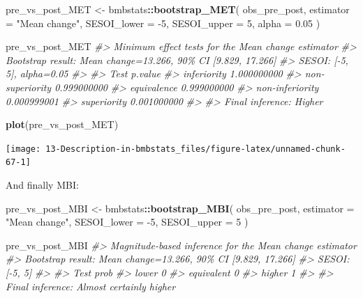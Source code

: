 \documentclass[
]{book}
\newenvironment{Shaded}{\begin{snugshade}}{\end{snugshade}}
\newcommand{\CommentTok}[1]{\textcolor[rgb]{0.56,0.35,0.01}{\textit{#1}}}
\newcommand{\DataTypeTok}[1]{\textcolor[rgb]{0.13,0.29,0.53}{#1}}
\newcommand{\DecValTok}[1]{\textcolor[rgb]{0.00,0.00,0.81}{#1}}
\newcommand{\FloatTok}[1]{\textcolor[rgb]{0.00,0.00,0.81}{#1}}
\newcommand{\KeywordTok}[1]{\textcolor[rgb]{0.13,0.29,0.53}{\textbf{#1}}}
\newcommand{\NormalTok}[1]{#1}
\newcommand{\OperatorTok}[1]{\textcolor[rgb]{0.81,0.36,0.00}{\textbf{#1}}}
\newcommand{\StringTok}[1]{\textcolor[rgb]{0.31,0.60,0.02}{#1}}
\begin{document}
\begin{Shaded}
\begin{Highlighting}[]
\NormalTok{pre\_vs\_post\_MET <{-}}\StringTok{ }\NormalTok{bmbstats}\OperatorTok{::}\KeywordTok{bootstrap\_MET}\NormalTok{(}
\NormalTok{  obs\_pre\_post,}
  \DataTypeTok{estimator =} \StringTok{"Mean change"}\NormalTok{,}
  \DataTypeTok{SESOI\_lower =} \DecValTok{{-}5}\NormalTok{,}
  \DataTypeTok{SESOI\_upper =} \DecValTok{5}\NormalTok{,}
  \DataTypeTok{alpha =} \FloatTok{0.05}
\NormalTok{)}

\NormalTok{pre\_vs\_post\_MET}
\CommentTok{\#> Minimum effect tests for the \textasciigrave{}Mean change\textasciigrave{} estimator}
\CommentTok{\#> Bootstrap result: Mean change=13.266, 90\% CI [9.829, 17.266]}
\CommentTok{\#> SESOI: [{-}5, 5], alpha=0.05}
\CommentTok{\#> }
\CommentTok{\#>             Test     p.value}
\CommentTok{\#>      inferiority 1.000000000}
\CommentTok{\#>  non{-}superiority 0.999000000}
\CommentTok{\#>      equivalence 0.999000000}
\CommentTok{\#>  non{-}inferiority 0.000999001}
\CommentTok{\#>      superiority 0.001000000}
\CommentTok{\#> }
\CommentTok{\#> Final inference: Higher}
\end{Highlighting}
\end{Shaded}

\begin{Shaded}
\begin{Highlighting}[]
\KeywordTok{plot}\NormalTok{(pre\_vs\_post\_MET)}
\end{Highlighting}
\end{Shaded}

\begin{center}\texttt{[image: 13-Description-in-bmbstats\_files/figure-latex/unnamed-chunk-67-1]} \end{center}

And finally MBI:

\begin{Shaded}
\begin{Highlighting}[]
\NormalTok{pre\_vs\_post\_MBI <{-}}\StringTok{ }\NormalTok{bmbstats}\OperatorTok{::}\KeywordTok{bootstrap\_MBI}\NormalTok{(}
\NormalTok{  obs\_pre\_post,}
  \DataTypeTok{estimator =} \StringTok{"Mean change"}\NormalTok{,}
  \DataTypeTok{SESOI\_lower =} \DecValTok{{-}5}\NormalTok{,}
  \DataTypeTok{SESOI\_upper =} \DecValTok{5}
\NormalTok{)}

\NormalTok{pre\_vs\_post\_MBI}
\CommentTok{\#> Magnitude{-}based inference for the \textasciigrave{}Mean change\textasciigrave{} estimator}
\CommentTok{\#> Bootstrap result: Mean change=13.266, 90\% CI [9.829, 17.266]}
\CommentTok{\#> SESOI: [{-}5, 5]}
\CommentTok{\#> }
\CommentTok{\#>        Test prob}
\CommentTok{\#>       lower    0}
\CommentTok{\#>  equivalent    0}
\CommentTok{\#>      higher    1}
\CommentTok{\#> }
\CommentTok{\#> Final inference: Almost certainly higher}
\end{Highlighting}
\end{Shaded}
\end{document}
